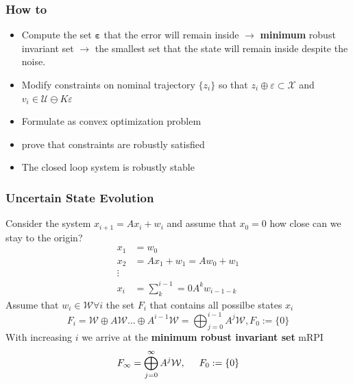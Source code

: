 \subsubsection{How to}
\begin{itemize}
    \item Compute the set $\mathbf{\varepsilon}$ that the error will remain inside $\rightarrow$ \textbf{minimum} robust invariant set $\rightarrow$ the smallest set that the state will remain inside despite the noise.
   
    \item Modify constraints on nominal trajectory $\{z_i\}$ so that $z_i\oplus\varepsilon\subset\mathcal{X}$ and $v_i \in \mathcal{U}\ominus K\varepsilon$
    \item Formulate as convex optimization problem
    \item prove that constraints are robustly satisfied
     \item The closed loop system is robustly stable
\end{itemize}
\subsubsection{Uncertain State Evolution}
Consider the system $x_{i+1} = Ax_i+w_i$ and assume that $x_0=0$ how close can we stay to the origin?
 \begin{align*}
     x_1 &= w_0\\
     x_2 &= Ax_1+w_1=Aw_0+w_1\\
     \vdots\\
     x_i &= \sum^{i-1}_k=0 A^kw_{i-1-k}
 \end{align*}
 Assume that $w_i\in\mathcal{W}\forall i$ the set $F_i$ that contains all possilbe states $x_i$ \[F_i=\mathcal{W}\oplus A\mathcal{W}\dots\oplus A^{i-1}\mathcal{W}=\bigoplus^{i-1}_{j=0}A^j\mathcal{W}, F_0 := \{0\}\]
With increasing $i$ we arrive at the \textbf{minimum robust invariant set} mRPI \[F_\infty=\bigoplus^\infty_{j=0}A^j\mathcal{W}, \hspace{5mm} F_0 := \{0\}\]
